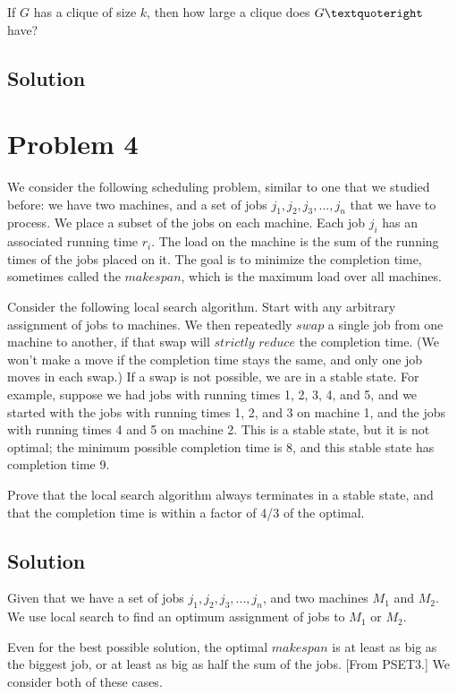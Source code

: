 \documentclass[11pt]{article}
\begin{document}
If $G$ has a clique of size $k$, then how large a clique does $G\textquoteright$ have?

\subsection{Solution}

\section{Problem 4}

We consider the following scheduling problem, similar to one that we studied before: we have two machines, and a set of jobs $j_1, j_2, j_3,..., j_n$ that we have to process. We place a subset of the jobs on each machine. Each job $j_i$ has an associated running time $r_i$. The load on the machine is the sum of the running times of the jobs placed on it. The goal is to minimize the completion time, sometimes called the $makespan$, which is the maximum load over all machines.

Consider the following local search algorithm. Start with any arbitrary assignment of jobs to machines. We then repeatedly $swap$ a single job from one machine to another, if that swap will $strictly$ $reduce$ the completion time. (We won't make a move if the completion time stays the same, and only one job moves in each swap.) If a swap is not possible, we are in a stable state. For example, suppose we had jobs with running times 1, 2, 3, 4, and 5, and we started with the jobs with running times 1, 2, and 3 on machine 1, and the jobs with running times 4 and 5 on machine 2. This is a stable state, but it is not optimal; the minimum possible completion time is 8, and this stable state has completion time 9.

Prove that the local search algorithm always terminates in a stable state, and that the completion time is within a factor of 4/3 of the optimal.

\subsection{Solution}
Given that we have a set of jobs $j_1, j_2, j_3,..., j_n$, and two machines $M_1$ and $M_2$. We use local search to find an optimum assignment of jobs to $M_1$ or $M_2$. 
	
Even for the best possible solution, the optimal $makespan$ is at least as big as the biggest job, or at least as big as half the sum of the jobs. [From PSET3.] We consider both of these cases.
	
\end{document}
